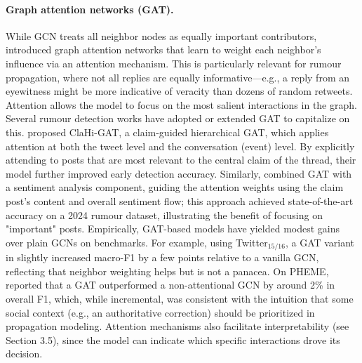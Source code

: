 \documentclass{cshonours}
\begin{document}
\paragraph{Graph attention networks (GAT).} While GCN treats all neighbor nodes as equally important contributors, \cite{velickovic2018gat} introduced graph attention networks that learn to weight each neighbor's influence via an attention mechanism. This is particularly relevant for rumour propagation, where not all replies are equally informative—e.g., a reply from an eyewitness might be more indicative of veracity than dozens of random retweets. Attention allows the model to focus on the most salient interactions in the graph. Several rumour detection works have adopted or extended GAT to capitalize on this. \cite{lin2021claim} proposed ClaHi-GAT, a claim-guided hierarchical GAT, which applies attention at both the tweet level and the conversation (event) level. By explicitly attending to posts that are most relevant to the central claim of the thread, their model further improved early detection accuracy. Similarly, \cite{ramezani2024claim} combined GAT with a sentiment analysis component, guiding the attention weights using the claim post's content and overall sentiment flow; this approach achieved state-of-the-art accuracy on a 2024 rumour dataset, illustrating the benefit of focusing on "important" posts. Empirically, GAT-based models have yielded modest gains over plain GCNs on benchmarks. For example, using Twitter$_{15/16}$, a GAT variant in \cite{lv2022rumor} slightly increased macro-F1 by a few points relative to a vanilla GCN, reflecting that neighbor weighting helps but is not a panacea. On PHEME, \cite{luo2021temporalfact} reported that a GAT outperformed a non-attentional GCN by around 2\% in overall F1, which, while incremental, was consistent with the intuition that some social context (e.g., an authoritative correction) should be prioritized in propagation modeling. Attention mechanisms also facilitate interpretability (see Section 3.5), since the model can indicate which specific interactions drove its decision.
\end{document}
